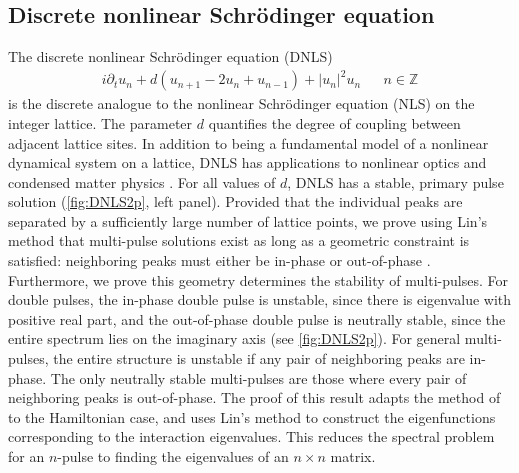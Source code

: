 \documentclass[12pt,reqno,oneside]{article}
\begin{document}
\subsection*{Discrete nonlinear Schr\"odinger equation}

The discrete nonlinear Schr{\"o}dinger equation (DNLS) 
\begin{align*}
    i \partial_t u_n + d(u_{n+1} - 2 u_n + u_{n-1}) + |u_n|^2 u_n && n \in \mathbb{Z}
\end{align*}
is the discrete analogue to the nonlinear Schr{\"o}dinger equation (NLS) on the integer lattice. The parameter $d$ quantifies the degree of coupling between adjacent lattice sites. In addition to being a fundamental model of a nonlinear dynamical system on a lattice, DNLS has applications to nonlinear optics and condensed matter physics \cite{Kevrekidis2009}. For all values of $d$, DNLS has a stable, primary pulse solution (\cref{fig:DNLS2p}, left panel). Provided that the individual peaks are separated by a sufficiently large number of lattice points, we prove using Lin's method that multi-pulse solutions exist as long as a geometric constraint is satisfied: neighboring peaks must either be in-phase or out-of-phase \cite{Parker2020}. Furthermore, we prove this geometry determines the stability of multi-pulses. For double pulses, the in-phase double pulse is unstable, since there is eigenvalue with positive real part, and the out-of-phase double pulse is neutrally stable, since the entire spectrum lies on the imaginary axis (see \cref{fig:DNLS2p}). For general multi-pulses, the entire structure is unstable if any pair of neighboring peaks are in-phase. The only neutrally stable multi-pulses are those where every pair of neighboring peaks is out-of-phase. The proof of this result adapts the method of \cite{Sandstede1998} to the Hamiltonian case, and uses Lin's method to construct the eigenfunctions corresponding to the interaction eigenvalues. This reduces the spectral problem for an $n$-pulse to finding the eigenvalues of an $n\times n$ matrix.
\end{document}
